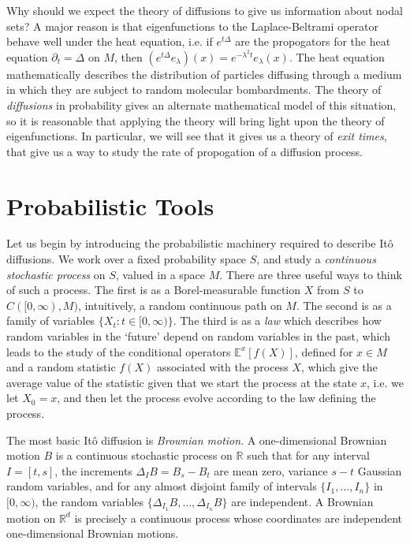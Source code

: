 \documentclass[12pt]{article}
\newcommand*{\R}{\mathbb{R}}
\begin{document}
Why should we expect the theory of diffusions to give us information about nodal sets? A major reason is that eigenfunctions to the Laplace-Beltrami operator behave well under the heat equation, i.e. if $e^{t \Delta}$ are the propogators for the heat equation $\partial_t = \Delta$ on $M$, then $(e^{t \Delta} e_\lambda)(x) = e^{-\lambda^2 t} e_\lambda(x)$. The heat equation mathematically describes the distribution of particles diffusing through a medium in which they are subject to random molecular bombardments. The theory of \emph{diffusions} in probability gives an alternate mathematical model of this situation, so it is reasonable that applying the theory will bring light upon the theory of eigenfunctions. In particular, we will see that it gives us a theory of \emph{exit times}, that give us a way to study the rate of propogation of a diffusion process.

\section{Probabilistic Tools}

Let us begin by introducing the probabilistic machinery required to describe It\^{o} diffusions. We work over a fixed probability space $S$, and study a \emph{continuous stochastic process} on $S$, valued in a space $M$. There are three useful ways to think of such a process. The first is as a Borel-measurable function $X$ from $S$ to $C([0,\infty), M)$, intuitively, a random continuous path on $M$. The second is as a family of variables $\{ X_t : t \in [0,\infty) \}$. The third is as a \emph{law} which describes how random variables in the `future' depend on random variables in the past, which leads to the study of the conditional operators $\mathbb{E}^x[f(X)]$, defined for $x \in M$ and a random statistic $f(X)$ associated with the process $X$, which give the average value of the statistic given that we start the process at the state $x$, i.e. we let $X_0 = x$, and then let the process evolve according to the law defining the process.

The most basic It\^{o} diffusion is \emph{Brownian motion}. A one-dimensional Brownian
motion $B$ is a continuous stochastic process on $\R$ such that for any interval $I = [t,s]$, the increments $\Delta_I B = B_s - B_t$ are mean zero, variance $s - t$ Gaussian random variables, and for any almost disjoint family of intervals $\{ I_1,\dots, I_n \}$ in $[0,\infty)$, the random variables $\{ \Delta_{I_1} B, \dots, \Delta_{I_n} B \}$ are independent. A Brownian motion on $\R^d$ is precisely a continuous process whose coordinates are independent one-dimensional Brownian motions.
\end{document}
